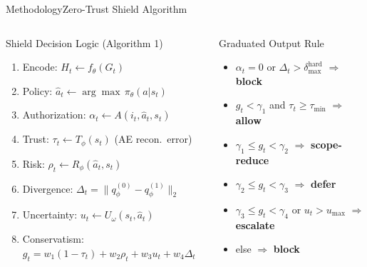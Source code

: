 \documentclass[aspectratio=169,10pt]{beamer}
\newcommand{\tightlist}{\setlength{\itemsep}{2pt}\setlength{\parskip}{0pt}\setlength{\topsep}{0pt}}
\begin{document}
\begin{frame}[t,shrink=20]{Methodology}{Zero-Trust Shield Algorithm}
  \begin{columns}[t]
    \vspace{0.1cm}
    \begin{block}{Shield Decision Logic (Algorithm 1)}
      \footnotesize
      \begin{enumerate}\tightlist
        \item Encode: $H_t \gets f_\theta(G_t)$
        \item Policy: $\hat{a}_t \gets \arg\max\,\pi_\theta(a|s_t)$
        \item Authorization: $\alpha_t \gets A(i_t, \hat{a}_t, s_t)$
        \item Trust: $\tau_t \gets T_\phi(s_t)$ \quad (AE recon.\ error)
        \item Risk: $\rho_t \gets R_\phi(\hat{a}_t, s_t)$
        \item Divergence: $\Delta_t = \|q_\phi^{(0)} - q_\phi^{(1)}\|_2$
        \item Uncertainty: $u_t \gets U_\omega(s_t, \hat{a}_t)$
        \item Conservatism: $g_t = w_1(1{-}\tau_t)+w_2\rho_t+w_3 u_t+w_4\Delta_t$
      \end{enumerate}
    \end{block}
    \vspace{0.2cm}
    \begin{alertblock}{Graduated Output Rule}
      \footnotesize
      \begin{itemize}\tightlist
        \item $\alpha_t{=}0$ or $\Delta_t{>}\delta^\text{hard}_\text{max}$ $\Rightarrow$ \textbf{block}
        \item $g_t{<}\gamma_1$ and $\tau_t{\ge}\tau_\text{min}$ $\Rightarrow$ \textbf{allow}
        \item $\gamma_1{\le}g_t{<}\gamma_2$ $\Rightarrow$ \textbf{scope-reduce}
        \item $\gamma_2{\le}g_t{<}\gamma_3$ $\Rightarrow$ \textbf{defer}
        \item $\gamma_3{\le}g_t{<}\gamma_4$ or $u_t{>}u_\text{max}$ $\Rightarrow$ \textbf{escalate}
        \item else $\Rightarrow$ \textbf{block}
      \end{itemize}

\end{alertblock}
\end{columns}
\end{frame}
\end{document}
